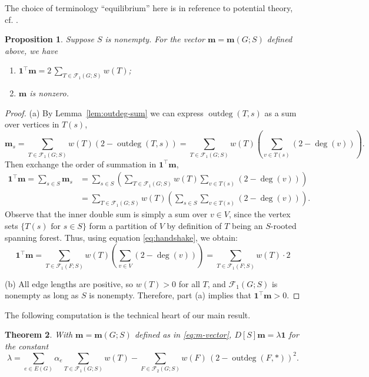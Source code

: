 \documentclass[12pt]{amsart}
\newtheorem{thm}{Theorem}[section]
\newtheorem{prop}[thm]{Proposition}
\theoremstyle{definition}
\newcommand{\bone}{\mathbf{1}}
\newcommand{\boldm}{\mathbf{m}}
\newcommand{\tr}{\intercal}
\newcommand{\trees}{\mathcal{F}_1}
\newcommand{\forests}{\mathcal{F}}
\DeclareMathOperator{\outdeg}{outdeg}
\begin{document}
The choice of terminology ``equilibrium'' here is in reference to potential theory, cf. \cite{Tsu, steinerberger}.

\begin{prop}
\label{prop:m-sum}
Suppose $S$ is nonempty.
For the vector $\boldm = \boldm(G; S)$ defined above, we have
\begin{enumerate}[label=(\alph*)]
\item
$\displaystyle \bone^\tr \boldm = 2 \,\sum_{T \in \trees(G;S)} w({T})$;

\item 
$\boldm$ is nonzero.
\end{enumerate}
\end{prop}
\begin{proof}
(a)
By Lemma~\ref{lem:outdeg-sum} we can express $\outdeg(T, s)$ as a sum over vertices in $T(s)$,
\[
	\boldm_s = \sum_{T \in \trees(G;S)} w({T}) (2 - \outdeg (T,s))
= \sum_{T \in \trees(G;S)} w({T}) \left( \sum_{v \in T(s)}(2 - \deg(v))\right).
\]
Then exchange the order of summation in $\bone^\tr \boldm$,
\begin{align*}
	\bone^\tr \boldm = \sum_{s\in S} \boldm_s &= \sum_{s \in S} \left( \sum_{T \in \trees(G;S)} w({T}) \sum_{v \in T(s)}(2 - \deg(v)) \right) \\
	&= \sum_{T \in \trees(G;S)} w({T}) \left( \sum_{s\in S} \sum_{v \in T(s)} (2 - \deg(v)) \right) .
\end{align*}
Observe that the inner double sum is simply a sum over $v \in V$,
since the vertex sets $\{T(s) \text{ for } s \in S\}$ form a partition of $V$ by definition of $T$ being an $S$-rooted spanning forest.
Thus, using  equation \eqref{eq:handshake}, we obtain:
\[
	\bone^\tr \boldm = \sum_{T \in \trees(F;S)} w({T}) \left( \sum_{v \in V} (2 - \deg(v))\right)
	= \sum_{T \in \trees(F;S)} w({T}) \cdot 2 
\]

(b) 
All edge lengths are positive, so $w({T}) > 0$ for all $T$, and $\trees(G; S)$ is nonempty as long as $S$ is nonempty. 
Therefore, part (a) implies that $\bone^\tr \boldm > 0$.
\end{proof}


The following computation is the technical heart of our main result.

\begin{thm}
\label{thm:m-distance-product}
With $\boldm = \boldm(G;S)$ defined as in \eqref{eq:m-vector},
$D[S] \boldm = \lambda \bone$
for the constant
\begin{equation}\label{eq:lambda}
	\lambda = \sum_{e \in E(G)} \alpha_e \sum_{T\in \trees(G;S)} w({T}) - \sum_{F \in \forests_2(G;S)} w({F}) \, (2 - \outdeg(F,*))^2.
\end{equation}
\end{thm}
\end{document}
